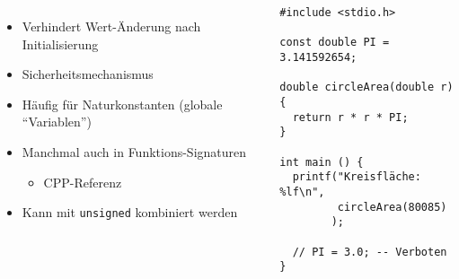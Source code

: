 
\begin{frame}[fragile]{}
%
\begin{columns}[T]
\begin{itemize}
\item Verhindert Wert-Änderung nach Initialisierung
\item Sicherheitsmechanismus
\item Häufig für Naturkonstanten (globale \enquote{Variablen})
\item Manchmal auch in Funktions-Signaturen
	\begin{itemize}
	\item CPP-Referenz
	\end{itemize}
\item Kann mit \texttt{unsigned} kombiniert werden
\end{itemize}
%
\vspace{-10pt}
\begin{codebox}
\begin{verbatim}
#include <stdio.h>

const double PI = 3.141592654;

double circleArea(double r) {
  return r * r * PI;
}

int main () {
  printf("Kreisfläche: %lf\n", 
         circleArea(80085)
        );
  
  // PI = 3.0; -- Verboten
}
\end{verbatim}
\end{codebox}
\end{columns}
%
\end{frame}


